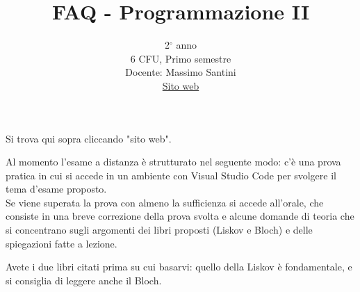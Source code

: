\documentclass{article}
\title{FAQ - \textbf{Programmazione II}}
\date{}
\author{
	2$^{\circ}$ anno\\6 CFU, Primo semestre\\
	Docente: Massimo Santini\\ 
	\href{https://prog2.di.unimi.it/}{Sito web}
}
\begin{document}
 
	\maketitle
	
	\begin{QuestionList}
		
		 {
		     Si trova qui sopra cliccando "sito web".
		 }
		
		 {
		    Al momento l'esame a distanza è strutturato nel seguente modo: c'è una prova pratica in cui si accede in un ambiente con Visual Studio Code per svolgere il tema d'esame proposto. \\
		    Se viene superata la prova con almeno la sufficienza si accede all'orale, che consiste in una breve correzione della prova svolta e alcune domande di teoria che si concentrano sugli argomenti dei libri proposti (Liskov e Bloch) e delle spiegazioni fatte a lezione.
		}
		
		
		 {
		    Avete i due libri citati prima su cui basarvi: quello della Liskov è fondamentale, e si consiglia
		    di leggere anche il Bloch.
		}
	\end{QuestionList}
	
\end{document}
